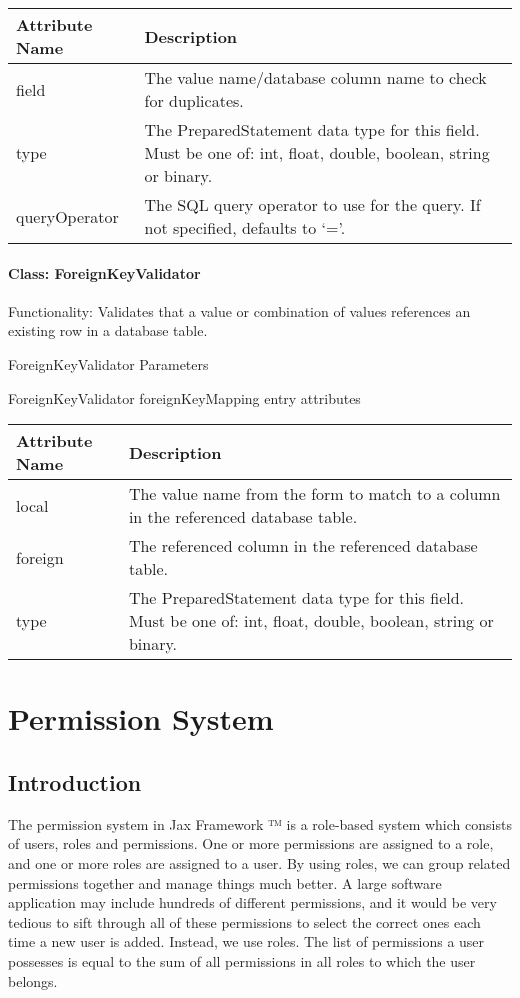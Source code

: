 \documentclass[letterpaper,10pt,english]{sphinxmanual}
\begin{document}
\begin{tabulary}{\linewidth}{|L|L|}
\hline
\textsf{\relax 
Attribute Name
} & \textsf{\relax 
Description
}\\
\hline
field
 & 
The value name/database column name to check for duplicates.
\\
\hline
type
 & 
The PreparedStatement data type for this field.  Must be one of: int, float, double,
boolean, string or binary.
\\
\hline
queryOperator
 & 
The SQL query operator to use for the query.  If not specified, defaults to `='.
\\
\hline\end{tabulary}



\subsubsection{Class: ForeignKeyValidator}
\label{jaxFrameworkGuide:class-foreignkeyvalidator}
Functionality: Validates that a value or combination of values references an existing row in a
database table.

ForeignKeyValidator Parameters

ForeignKeyValidator foreignKeyMapping entry attributes

\begin{tabulary}{\linewidth}{|L|L|}
\hline
\textsf{\relax 
Attribute Name
} & \textsf{\relax 
Description
}\\
\hline
local
 & 
The value name from the form to match to a column in the referenced database table.
\\
\hline
foreign
 & 
The referenced column in the referenced database table.
\\
\hline
type
 & 
The PreparedStatement data type for this field.  Must be one of: int, float, double,
boolean, string or binary.
\\
\hline\end{tabulary}



\chapter{Permission System}
\label{jaxFrameworkGuide:permission-system}

\section{Introduction}
\label{jaxFrameworkGuide:id22}
The permission system in Jax Framework ™ is a role-based system which consists of users, roles
and permissions.  One or more permissions are assigned to a role, and one or more roles are assigned
to a user.  By using roles, we can group related permissions together and manage things much better.
A large software application may include hundreds of different permissions, and it would be very
tedious to sift through all of these permissions to select the correct ones each time a new user is
added.  Instead, we use roles.  The list of permissions a user possesses is equal to the sum of all
permissions in all roles to which the user belongs.
\end{document}
